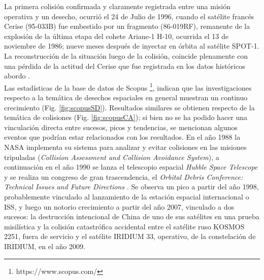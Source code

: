 La primera colisi\'on confirmada y claramente registrada entre una misi\'on operativa y un desecho, ocurri\'o el 24 de Julio de 1996, cuando el sat\'elite franc\'es Cerise (95-033B) fue embestido por un fragmento (86-019RF), remanente de la explosi\'on de la \'ultima etapa del cohete Ariane-1 H-10, ocurrida el 13 de noviembre de 1986; nueve meses despu\'es de inyectar en \'orbita al sat\'elite SPOT-1. La reconstrucci\'on de la situaci\'on luego de la colisi\'on, coincide plenamente con una p\'erdida de la actitud del Cerise que fue registrada en los datos hist\'oricos abordo \citep{KlinkradChapter8}.\\

Las estad\'isticas de la base de datos de Scopus \footnote{https://www.scopus.com/}, indican que las investigaciones respecto a la tem\'atica de desechos espaciales en general muestran un continuo crecimiento (Fig. \ref{fig:scopusSD}). Resultados similares se obtienen respecto de la tem\'atica de colisiones (Fig. \ref{fig:scopusCA}); si bien no se ha podido hacer una vinculaci\'on directa entre sucesos, picos y tendencias, se mencionan algunos eventos que podr\'ian estar relacionados con los resultados. En el a\~no 1988 la \ac{NASA} implementa su sistema para analizar y evitar colisiones en las misiones tripuladas ({\it{Collision Assessment and Collision Avoidance System}}), a continuaci\'on en el a\~no 1990 se lanza el telescopio espacial {\it{Hubble Space Telescope}} y se realiza un congreso de gran trascendencia, el {\it{Orbital Debris Conference: Technical Issues and Future Directions }}. Se observa un pico a partir del a\~no 1998, probablemente vinculado al lanzamiento de la estaci\'on espacial internacional o \ac{ISS}, y luego un notorio crecimiento a partir del a\~no 2007, vinculado a dos sucesos: la destrucci\'on intencional de China de uno de sus sat\'elites en una prueba misil\'istica y la colisi\'on catastr\'ofica accidental entre el sat\'elite ruso KOSMOS 2251, fuera de servicio y el sat\'elite IRIDIUM 33, operativo, de la constelaci\'on de IRIDIUM, en el a\~no 2009.\\




